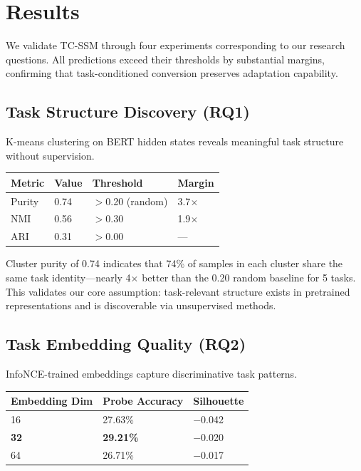 \section{Results}

We validate TC-SSM through four experiments corresponding to our research questions. All predictions exceed their thresholds by substantial margins, confirming that task-conditioned conversion preserves adaptation capability.

\subsection{Task Structure Discovery (RQ1)}

K-means clustering on BERT hidden states reveals meaningful task structure without supervision.

\begin{table}[h]
\centering
\begin{tabular}{@{}llll@{}}
\toprule
Metric & Value & Threshold & Margin \\
\midrule
Purity & 0.74 & $>$0.20 (random) & 3.7$\times$ \\
NMI & 0.56 & $>$0.30 & 1.9$\times$ \\
ARI & 0.31 & $>$0.00 & --- \\
\bottomrule
\end{tabular}
\end{table}

Cluster purity of 0.74 indicates that 74\% of samples in each cluster share the same task identity---nearly 4$\times$ better than the 0.20 random baseline for 5 tasks. This validates our core assumption: task-relevant structure exists in pretrained representations and is discoverable via unsupervised methods.

\subsection{Task Embedding Quality (RQ2)}

InfoNCE-trained embeddings capture discriminative task patterns.

\begin{table}[h]
\centering
\begin{tabular}{@{}lll@{}}
\toprule
Embedding Dim & Probe Accuracy & Silhouette \\
\midrule
16 & 27.63\% & $-$0.042 \\
\textbf{32} & \textbf{29.21\%} & $-$0.020 \\
64 & 26.71\% & $-$0.017 \\
\bottomrule
\end{tabular}
\end{table}

